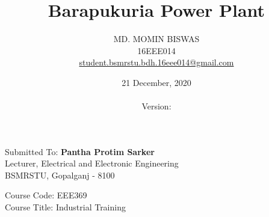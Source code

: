 \documentclass[11 pt]{article}
\title{\textcolor{Firebrick4}{\textbf{Barapukuria Power Plant}}}
\author
{
	MD. MOMIN BISWAS\\
	16EEE014\\
	\href{mailto:student.bsmrstu.bdh.16eee014@gmail.com}{\textcolor{DeepSkyBlue4}{student.bsmrstu.bdh.16eee014@gmail.com}}
}
\date{21 December, 2020 \\ \currenttime \\ Version: \version}
\affil{Department of EEE, BSMRSTU}
\begin{document}
\pagecolor{Green2}
\maketitle

\pagebreak

\pagecolor{white}

\begin{center}
	Submitted To: \textbf{{\Large Pantha Protim Sarker}} \\
	Lecturer, Electrical and Electronic Engineering \\
	BSMRSTU, Gopalganj - 8100 \\
\end{center}

\vspace{20 mm}

Course Code: EEE369 \\
Course Title: Industrial Training

\pagebreak

\tableofcontents
\pagebreak
\listoffigures

\pagebreak

\justify
\end{document}
